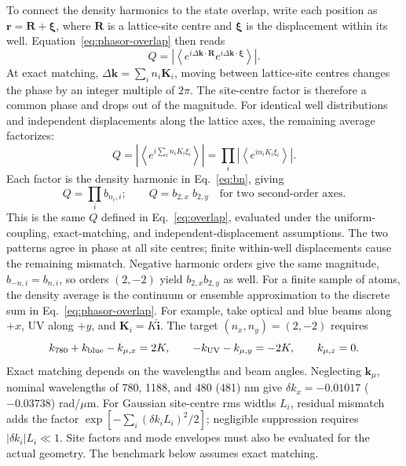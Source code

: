 \documentclass[aps,pra,onecolumn,10pt,letterpaper,notitlepage,nofootinbib,amsmath,amssymb]{revtex4-2}
\begin{document}
To connect the density harmonics to the state overlap, write each position as
$\mathbf r=\mathbf R+\boldsymbol\xi$, where $\mathbf R$ is a lattice-site centre
and $\boldsymbol\xi$ is the displacement within its well. Equation~\eqref{eq:phasor-overlap}
then reads
\[
 Q=\left|\left\langle
 e^{i\Delta\mathbf k\cdot\mathbf R}
 e^{i\Delta\mathbf k\cdot\boldsymbol\xi}\right\rangle\right|.
\]
At exact matching, $\Delta\mathbf k=\sum_i n_i\mathbf K_i$, moving between
lattice-site centres changes the phase by an integer multiple of $2\pi$.
The site-centre factor is therefore a common phase and drops out of the
magnitude. For identical well distributions and independent displacements
along the lattice axes, the remaining average factorizes:
\[
 Q=\left|\left\langle e^{i\sum_i n_iK_i\xi_i}\right\rangle\right|
  =\prod_i\left|\left\langle e^{in_iK_i\xi_i}\right\rangle\right|.
\]
Each factor is the density harmonic in Eq.~\eqref{eq:bn}, giving
\begin{equation}
 Q=\prod_i b_{n_i,i};\qquad Q=b_{2,x}\; b_{2,y}
 \quad\text{for two second-order axes}.
 \label{eq:qproduct}
\end{equation}
This is the same $Q$ defined in Eq.~\eqref{eq:overlap}, evaluated under the
uniform-coupling, exact-matching, and independent-displacement assumptions.
The two patterns agree in phase at all site centres; finite within-well
displacements cause the remaining mismatch. Negative harmonic orders give
the same magnitude, $b_{-n,i}=b_{n,i}$, so orders $(2,-2)$ yield
$b_{2,x}b_{2,y}$ as well. For a finite sample of atoms, the density average is
the continuum or ensemble approximation to the discrete sum in
Eq.~\eqref{eq:phasor-overlap}.
For example, take optical and blue beams along $+x$, UV along $+y$, and
$\mathbf K_i=K\hat{\mathbf i}$. The target $(n_x,n_y)=(2,-2)$ requires
\begin{equation}
 k_{780}+k_{\rm blue}-k_{\mu,x}=2K,\qquad
 -k_{\rm UV}-k_{\mu,y}=-2K,\qquad k_{\mu,z}=0.
 \label{eq:geometry-components}
\end{equation}
Exact matching depends on the wavelengths and beam angles.
Neglecting $\mathbf k_\mu$, nominal wavelengths of 780, 1188, and 480 (481) nm give
$\delta k_x=-0.01017$ ($-0.03738$) rad/$\mu$m. For Gaussian site-centre rms widths
$L_i$, residual mismatch adds the factor
$\exp[-\sum_i(\delta k_iL_i)^2/2]$; negligible suppression requires
$|\delta k_i|L_i\ll1$. Site factors and mode envelopes must also be evaluated
for the actual geometry. The benchmark below assumes exact matching.
\end{document}
